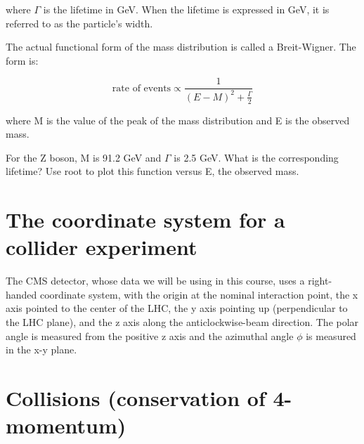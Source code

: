 \noindent where  $\Gamma$ is the lifetime in GeV.  When the lifetime is expressed in GeV,  it is referred to as the particle's width.

\noindent The actual functional form of the mass distribution is called a Breit-Wigner.  The form is:

\begin{equation} \text{rate  of  events} \propto \frac{1}{(E-M)^2 + \frac{\Gamma}{2}} \end{equation} 

\noindent where M is the value of the peak of the mass distribution and E is the observed mass.

\vspace{.2cm} 
\begin{minipage}{0.9\textwidth} 
\begin{framed}
\begin{exercise}
{For the Z boson, M is 91.2 GeV and $\Gamma$  is 2.5 GeV.  What is the corresponding lifetime?  Use root to plot this function versus E, the observed mass.}
\end{exercise}
\end{framed} 
\end{minipage}
\vspace{.2cm}



\section{The coordinate system for a collider experiment}

The CMS detector, whose data we will be using in this course, uses a right-handed coordinate system, with the origin at the nominal interaction point, the x axis pointed to the center of the LHC, the y axis pointing up (perpendicular to the LHC plane), and the z axis along the anticlockwise-beam direction.  The polar angle   is measured from the positive z axis and the azimuthal angle  $\phi$  is measured in the x-y plane.

\section{Collisions (conservation of 4-momentum)}

